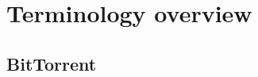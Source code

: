 \documentclass[conference]{IEEEtran}
\begin{document}
	
	
	
	
	
	\section{Terminology overview}
	\subsection{BitTorrent}
	
\end{document}
